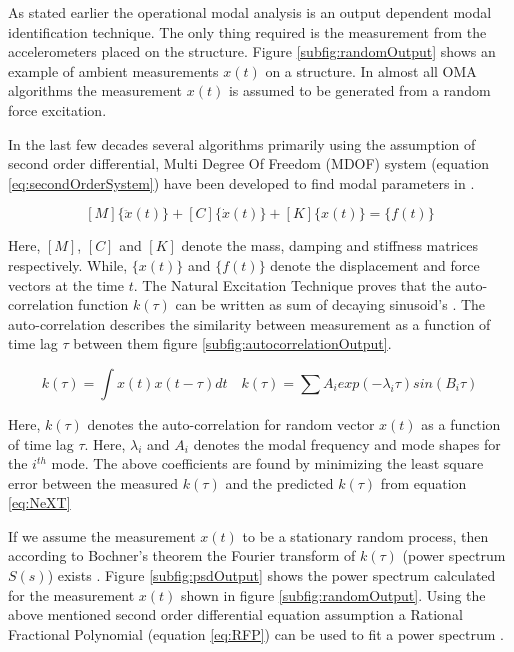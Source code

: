 As stated earlier the operational modal analysis is an output dependent modal identification technique. The only thing required is the measurement from the accelerometers placed on the structure. Figure \ref{subfig:randomOutput} shows an example of ambient measurements \(x(t)\) on a structure.  In almost all OMA algorithms the measurement \(x(t)\) is assumed to be generated from a random force excitation. 

In the last few decades several algorithms primarily using the assumption of second order differential, Multi Degree Of Freedom (MDOF) system (equation \ref{eq:secondOrderSystem}) have been developed to find modal parameters in \cite{guillaume2003poly, richardson1982parameter}.

\begin{equation}\label{eq:secondOrderSystem}
    [M]\{\ddot{x}(t)\} + [C]\{\dot{x}(t)\} + [K]\{x(t)\} = \{f(t)\}
\end{equation}

Here, \([M]\), \([C]\) and \([K]\) denote the mass, damping and stiffness matrices respectively. While, \(\{x(t)\}\) and \(\{f(t)\}\) denote the displacement and force vectors at the time \(t\). The Natural Excitation Technique \cite{james1995natural} proves that the auto-correlation function \(k(\tau)\) can be written as sum of decaying sinusoid's \cite{spitznogle1970representation, ibrahim1977method, guillaume2003poly}. The auto-correlation describes the similarity between measurement as a function of time lag \(\tau\) between them figure \ref{subfig:autocorrelationOutput}.  

\begin{equation}\label{eq:NeXT}
    k(\tau) = \int x(t)x(t-\tau)dt \quad k(\tau) = \sum A_{i}exp(-\lambda_{i}\tau)sin(B_{i}\tau)
\end{equation}

Here, \(k(\tau)\) denotes the auto-correlation for random vector \(x(t)\) as a function of time lag \(\tau\). Here, \(\lambda_{i}\) and \(A_{i}\) denotes the modal frequency and mode shapes for the \(i^{th}\) mode. The above coefficients are found by minimizing the least square error between the measured \(k(\tau)\) and the predicted \(k(\tau)\) from equation \ref{eq:NeXT}

If we assume the measurement \(x(t)\) to be a stationary random process, then according to Bochner's theorem the Fourier transform of \(k(\tau)\) (power spectrum \(S(s)\)) exists \cite{bochner2016lectures}. Figure \ref{subfig:psdOutput} shows the power spectrum calculated for the measurement \(x(t)\) shown in figure \ref{subfig:randomOutput}. Using the above mentioned second order differential equation assumption a Rational Fractional Polynomial (equation \ref{eq:RFP}) can be used to fit a power spectrum \cite{richardson1982parameter, allemang1998unified, chauhan2007unified}.

